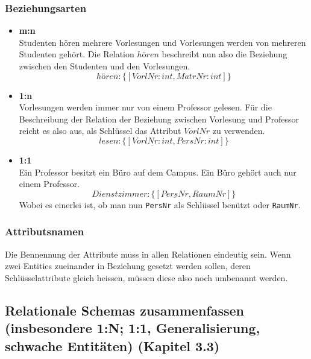 \subsubsection{Beziehungsarten}

\begin{itemize}
    \item \textbf{m:n} \\
    Studenten hören mehrere Vorlesungen und Vorlesungen werden von mehreren Studenten gehört. Die Relation \(hören\) beschreibt nun also die Beziehung zwischen den Studenten und den Vorlesungen. 
    \begin{equation*}
        hören : \{[\underline{VorlNr: int}, \underline{MatrNr: int}]\}
    \end{equation*}

    \item \textbf{1:n} \\
    Vorlesungen werden immer nur von einem Professor gelesen. Für die Beschreibung der Relation der Beziehung zwischen Vorlesung und Professor reicht es also aus, als Schlüssel das Attribut \(VorlNr\) zu verwenden.
        \begin{equation*}
            lesen : \{[\underline{VorlNr: int}, PersNr: int]\}
        \end{equation*}
    \item \textbf{1:1} \\
        Ein Professor besitzt ein Büro auf dem Campus. Ein Büro gehört auch nur einem Professor.
        \begin{equation}
            Dienstzimmer : \{[\underline{PersNr}, RaumNr]\}
        \end{equation}
        Wobei es einerlei ist, ob man nun \verb|PersNr| als Schlüssel benützt oder \verb|RaumNr|.
\end{itemize}

\subsubsection{Attributsnamen}
Die Bennennung der Attribute muss in allen Relationen eindeutig sein. Wenn zwei Entities zueinander in Beziehung gesetzt werden sollen, deren Schlüsselattribute gleich heissen, müssen diese also noch umbenannt werden.
\subsection{Relationale Schemas zusammenfassen (insbesondere 1:N; 1:1, Generalisierung, schwache Entitäten) (Kapitel 3.3)}

